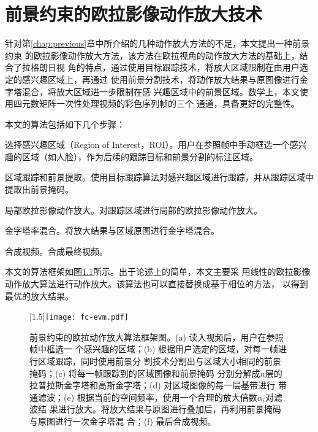 \chapter{前景约束的欧拉影像动作放大技术}
\label{chap:fc-evm}

针对第\ref{chap:previous}章中所介绍的几种动作放大方法的不足，本文提出一种前景约束
的欧拉影像动作放大方法，该方法在欧拉视角的动作放大方法的基础上，结合了拉格朗日视
角的特点，通过使用目标跟踪技术，将放大区域限制在由用户选定的感兴趣区域上，再通过
使用前景分割技术，将动作放大结果与原图像进行金字塔混合，将放大区域进一步限制在感
兴趣区域中的前景区域。数学上，本文使用四元数矩阵一次性处理视频的彩色序列帧的三个
通道，具备更好的完整性。

本文的算法包括如下几个步骤：

\begin{compactenum}
\item 选择感兴趣区域（Region of Interest，ROI）。用户在参照帧中手动框选一个感兴
  趣的区域（如人脸），作为后续的跟踪目标和前景分割的标注区域。
\item 区域跟踪和前景提取。使用目标跟踪算法对感兴趣区域进行跟踪，并从跟踪区域中提取出前景掩码。
\item 局部欧拉影像动作放大。对跟踪区域进行局部的欧拉影像动作放大。
\item 金字塔率混合。将放大结果与区域原图进行金字塔混合。
\item 合成视频。合成最终视频。
\end{compactenum}

本文的算法框架如图\ref{fig:fc-evm-frameworks}所示。出于论述上的简单，本文主要采
用线性的欧拉影像动作放大算法进行动作放大。该算法也可以直接替换成基于相位的方法，
以得到最优的放大结果。

\begin{landscape}
  \begin{figure}[htbp]
  \centering
  \scalebox{1.5}[1.5]{\texttt{[image: fc-evm.pdf]}}
  \caption{前景约束的欧拉动作放大算法框架图。(a) 读入视频后，用户在参照帧中框选一
    个感兴趣的区域；(b) 根据用户选定的区域，对每一帧进行区域跟踪，同时使用前景分
    割技术分割出与区域大小相同的前景掩码；(c) 将每一帧跟踪到的区域图像和前景掩码
    分别分解成$n$层的拉普拉斯金字塔和高斯金字塔；(d) 对区域图像的每一层基带进行
    带通滤波；(e) 根据当前的空间频率，使用一个合理的放大倍数$\alpha_i$对滤波结
    果进行放大。将放大结果与原图进行叠加后，再利用前景掩码与原图进行一次金字塔混
    合；(f) 最后合成视频。}
  \label{fig:fc-evm-frameworks}
\end{figure}
\end{landscape}

